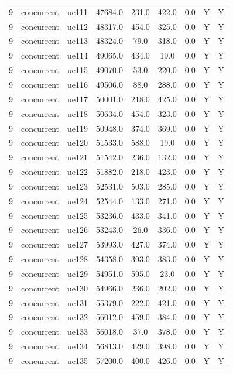 \begin{table}[ht]
\begin{tabular}{|c|c|c|c|c|c|c|c|c|}
9 & concurrent & ue111 & 47684.0 & 231.0 & 422.0 & 0.0 & Y & Y \\
9 & concurrent & ue112 & 48317.0 & 454.0 & 325.0 & 0.0 & Y & Y \\
9 & concurrent & ue113 & 48324.0 & 79.0 & 318.0 & 0.0 & Y & Y \\
9 & concurrent & ue114 & 49065.0 & 434.0 & 19.0 & 0.0 & Y & Y \\
9 & concurrent & ue115 & 49070.0 & 53.0 & 220.0 & 0.0 & Y & Y \\
9 & concurrent & ue116 & 49506.0 & 88.0 & 288.0 & 0.0 & Y & Y \\
9 & concurrent & ue117 & 50001.0 & 218.0 & 425.0 & 0.0 & Y & Y \\
9 & concurrent & ue118 & 50634.0 & 454.0 & 323.0 & 0.0 & Y & Y \\
9 & concurrent & ue119 & 50948.0 & 374.0 & 369.0 & 0.0 & Y & Y \\
9 & concurrent & ue120 & 51533.0 & 588.0 & 19.0 & 0.0 & Y & Y \\
9 & concurrent & ue121 & 51542.0 & 236.0 & 132.0 & 0.0 & Y & Y \\
9 & concurrent & ue122 & 51882.0 & 218.0 & 423.0 & 0.0 & Y & Y \\
9 & concurrent & ue123 & 52531.0 & 503.0 & 285.0 & 0.0 & Y & Y \\
9 & concurrent & ue124 & 52544.0 & 133.0 & 271.0 & 0.0 & Y & Y \\
9 & concurrent & ue125 & 53236.0 & 433.0 & 341.0 & 0.0 & Y & Y \\
9 & concurrent & ue126 & 53243.0 & 26.0 & 336.0 & 0.0 & Y & Y \\
9 & concurrent & ue127 & 53993.0 & 427.0 & 374.0 & 0.0 & Y & Y \\
9 & concurrent & ue128 & 54358.0 & 393.0 & 383.0 & 0.0 & Y & Y \\
9 & concurrent & ue129 & 54951.0 & 595.0 & 23.0 & 0.0 & Y & Y \\
9 & concurrent & ue130 & 54966.0 & 236.0 & 202.0 & 0.0 & Y & Y \\
9 & concurrent & ue131 & 55379.0 & 222.0 & 421.0 & 0.0 & Y & Y \\
9 & concurrent & ue132 & 56012.0 & 459.0 & 384.0 & 0.0 & Y & Y \\
9 & concurrent & ue133 & 56018.0 & 37.0 & 378.0 & 0.0 & Y & Y \\
9 & concurrent & ue134 & 56813.0 & 429.0 & 398.0 & 0.0 & Y & Y \\
9 & concurrent & ue135 & 57200.0 & 400.0 & 426.0 & 0.0 & Y & Y \\

\end{tabular}
\end{table}
